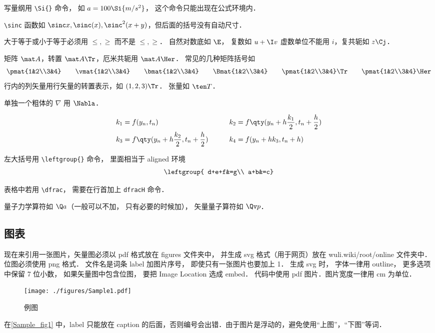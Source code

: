 写量纲用 \lstinline|\Si{}| 命令， 如 $a = 100\Si{m/s^2}$， 这个命令只能出现在公式环境内．

 \lstinline|\sinc| 函数如 $\sinc x, \sinc(x), \sinc^2(x+y)$，但后面的括号没有自动尺寸．
 
 大于等于或小于等于必须用 $\leqslant, \geqslant$ 而不是 $\le, \ge$． 自然对数底如 $\E$， 复数如 $u+\I v$ 虚数单位不能用 $i$，复共轭如 $z\Cj$．
 
 矩阵 $\mat A$，转置 $\mat A \Tr$，厄米共轭用 $\mat A \Her$． 常见的几种矩阵括号如
\begin{equation}
\pmat{1&2\\3&4} \qquad
\vmat{1&2\\3&4} \qquad 
\bmat{1&2\\3&4} \qquad
\Bmat{1&2\\3&4} \qquad
\pmat{1&2\\3&4}\Tr \qquad
\pmat{1&2\\3&4}\Her
\end{equation}
行内的列矢量用行矢量的转置表示，如 $(1,2,3)\Tr$． 张量如 $\ten T$．

单独一个粗体的 $\nabla$ 用 $\Nabla$．

\begin{equation}
\begin{aligned}
k_1 &= f(y_n, t_n) 
& k_2 &= f \qty(y_n + h\frac{k_1}{2}, t_n + \frac h2 )\\
k_3 &= f \qty( y_n + h\frac{k_2}{2}, t_n + \frac h2 ) \qquad
& k_4 &= f(y_n + hk_3, t_n + h)
\end{aligned}
\end{equation}

左大括号用 \lstinline|\leftgroup{}| 命令， 里面相当于 aligned 环境
\begin{equation}
\leftgroup{
d+e+f&=g\\
a+b&=c}
\end{equation}

表格中若用 \lstinline|\dfrac|， 需要在行首加上 \lstinline|dfracH| 命令．%

量子力学算符如 $\Q a$（一般可以不加， 只有必要的时候加）， 矢量量子算符如 $\Qv p$．


\subsection{图表}

现在来引用一张图片，矢量图必须以 pdf 格式放在 figures 文件夹中， 并生成 svg 格式（用于网页）放在 wuli.wiki/root/online 文件夹中． 位图必须使用 png 格式． 文件名是词条 label 加图片序号， 即使只有一张图片也要加上 1． 生成 svg 时， 字体一律用 outline， 更多选项中保留 7 位小数， 如果矢量图中包含位图， 要把 Image Location 选成 embed． 代码中使用 pdf 图片．图片宽度一律用 cm 为单位．
\begin{figure}[ht]
\centering
\texttt{[image: ./figures/Sample1.pdf]}
\caption{例图} \label{Sample_fig1}
\end{figure}
在\autoref{Sample_fig1} 中，label 只能放在 caption 的后面，否则编号会出错．由于图片是浮动的，避免使用“上图”，“下图”等词．

